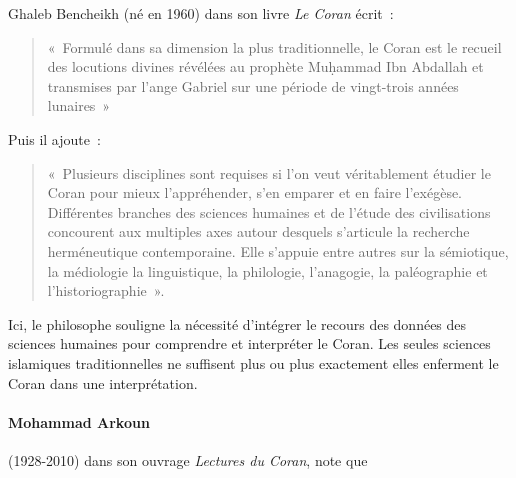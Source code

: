 Ghaleb Bencheikh (né en 1960) dans son livre \emph{Le Coran} écrit~:
\begin{quote}
    

«~Formulé dans sa dimension la plus traditionnelle, le Coran est le
recueil des locutions divines révélées au prophète Muḥammad Ibn Abdallah
et transmises par l'ange Gabriel sur une période de vingt-trois années
lunaires~»
\end{quote}
Puis il ajoute~:
\begin{quote}
«~Plusieurs disciplines sont requises si l'on veut véritablement étudier
le Coran pour mieux l'appréhender, s'en emparer et en faire l'exégèse.
Différentes branches des sciences humaines et de l'étude des
civilisations concourent aux multiples axes autour desquels s'articule
la recherche herméneutique contemporaine. Elle s'appuie entre autres sur
la sémiotique, la médiologie la linguistique, la philologie, l'anagogie,
la paléographie et l'historiographie~».
\end{quote}
Ici, le philosophe souligne la nécessité d'intégrer le recours des
données des sciences humaines pour comprendre et interpréter le Coran.
Les seules sciences islamiques traditionnelles ne suffisent plus ou plus
exactement elles enferment le Coran dans une interprétation.

\paragraph{Mohammad Arkoun} (1928-2010) dans son ouvrage \emph{Lectures du
Coran}, note que


